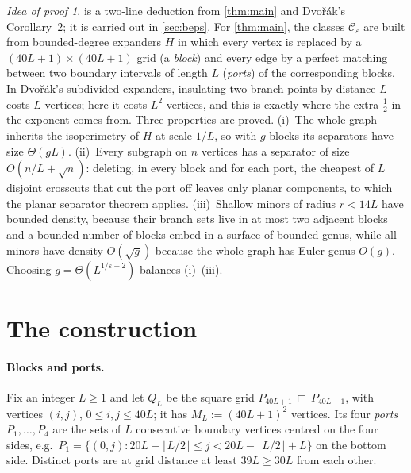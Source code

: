 \documentclass[11pt,a4paper]{article}
\theoremstyle{plain}
\theoremstyle{definition}
\theoremstyle{remark}
\newtheorem*{proofidea}{Idea of proof}
\newcommand{\cC}{\mathcal C}
\begin{document}
\begin{proofidea}
 is a two-line deduction from \cref{thm:main} and Dvořák's Corollary~2; it is carried out in \cref{sec:beps}. For \cref{thm:main}, the classes $\cC_\varepsilon$ are built from bounded-degree expanders $H$ in which every vertex is replaced by a $(40L+1)\times(40L+1)$ grid (a \emph{block}) and every edge by a perfect matching between two boundary intervals of length $L$ (\emph{ports}) of the corresponding blocks. In Dvořák's subdivided expanders, insulating two branch points by distance $L$ costs $L$ vertices; here it costs $L^2$ vertices, and this is exactly where the extra $\frac12$ in the exponent comes from. Three properties are proved. (i)~The whole graph inherits the isoperimetry of $H$ at scale $1/L$, so with $g$ blocks its separators have size $\Theta(gL)$. (ii)~Every subgraph on $n$ vertices has a separator of size $O(n/L+\sqrt n)$: deleting, in every block and for each port, the cheapest of $L$ disjoint crosscuts that cut the port off leaves only planar components, to which the planar separator theorem applies. (iii)~Shallow minors of radius $r<14L$ have bounded density, because their branch sets live in at most two adjacent blocks and a bounded number of blocks embed in a surface of bounded genus, while all minors have density $O(\sqrt g)$ because the whole graph has Euler genus $O(g)$. Choosing $g=\Theta(L^{1/\varepsilon-2})$ balances (i)--(iii).
\end{proofidea}

\section{The construction}\label{sec:construction}

\paragraph{Blocks and ports.}
Fix an integer $L\ge1$ and let $Q_L$ be the square grid $P_{40L+1}\,\mathbin{\mdlgwhtsquare}\,P_{40L+1}$, with vertices $(i,j)$, $0\le i,j\le 40L$; it has $M_L:=(40L+1)^2$ vertices. Its four \emph{ports} $P_1,\dots,P_4$ are the sets of $L$ consecutive boundary vertices centred on the four sides, e.g.\ $P_1=\{(0,j): 20L-\lfloor L/2\rfloor\le j<20L-\lfloor L/2\rfloor+L\}$ on the bottom side. Distinct ports are at grid distance at least $39L\ge 30L$ from each other.
\end{document}
